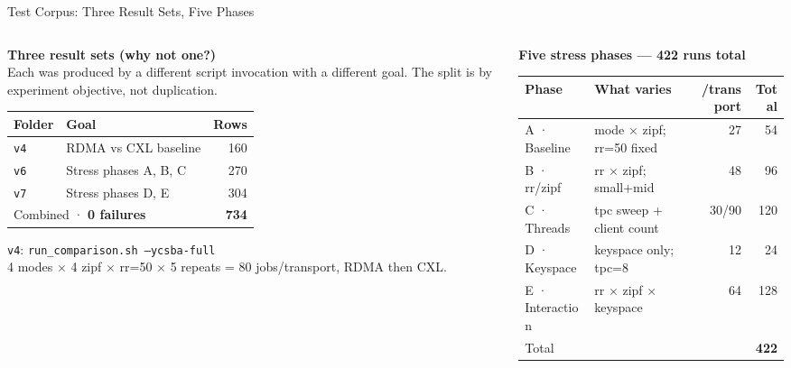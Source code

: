 \documentclass[aspectratio=169,8pt]{beamer}
\newcommand{\sys}[1]{\texttt{#1}}
\newcommand{\good}[1]{\textcolor{green!50!black}{\textbf{#1}}}
\begin{document}
\begin{frame}{Test Corpus: Three Result Sets, Five Phases}

\begin{columns}[T,onlytextwidth]
\begin{column}{0.44\textwidth}

\textbf{Three result sets (why not one?)}\\[0.3em]
{\small Each was produced by a different script invocation with a different goal. The split is by experiment objective, not duplication.}

\vspace{0.4em}
{\small
\begin{tabular}{llr}
\toprule
Folder & Goal & Rows \\
\midrule
\texttt{v4} & RDMA vs CXL baseline & 160 \\
\texttt{v6} & Stress phases A, B, C & 270 \\
\texttt{v7} & Stress phases D, E & 304 \\
\midrule
\multicolumn{2}{l}{Combined · \good{0 failures}} & \textbf{734} \\
\bottomrule
\end{tabular}
}

\vspace{0.4em}
{\small \texttt{v4}: \sys{run\_comparison.sh --ycsba-full}\\
4 modes $\times$ 4 zipf $\times$ rr=50 $\times$ 5 repeats = 80 jobs/transport, RDMA then CXL.}

\end{column}
\begin{column}{0.54\textwidth}

\textbf{Five stress phases — 422 runs total}\\[0.3em]
{\small
\begin{tabular}{llrr}
\toprule
Phase & What varies & /transport & Total \\
\midrule
A · Baseline & mode $\times$ zipf; rr=50 fixed & 27 & 54 \\
B · rr/zipf & rr $\times$ zipf; small+mid & 48 & 96 \\
C · Threads & tpc sweep + client count & 30/90 & 120 \\
D · Keyspace & keyspace only; tpc=8 & 12 & 24 \\
E · Interaction & rr $\times$ zipf $\times$ keyspace & 64 & 128 \\
\midrule
\multicolumn{2}{l}{Total} & & \textbf{422} \\
\bottomrule
\end{tabular}
}


\end{column}
\end{columns}
\end{frame}
\end{document}
